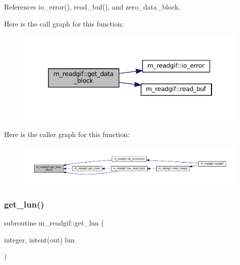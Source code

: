 References io\+\_\+error(), read\+\_\+buf(), and zero\+\_\+data\+\_\+block.

Here is the call graph for this function\+:\nopagebreak
\begin{figure}[H]
\begin{center}
\leavevmode
\includegraphics[width=346pt]{namespacem__readgif_ace6e51d0293107696bd1482348414a43_cgraph}
\end{center}
\end{figure}
Here is the caller graph for this function\+:\nopagebreak
\begin{figure}[H]
\begin{center}
\leavevmode
\includegraphics[width=350pt]{namespacem__readgif_ace6e51d0293107696bd1482348414a43_icgraph}
\end{center}
\end{figure}
\mbox{\label{namespacem__readgif_a7109d632cddcb8d66729d25bbed5c33c}} 
\subsubsection{\texorpdfstring{get\+\_\+lun()}{get\_lun()}}
{\footnotesize\ttfamily subroutine m\+\_\+readgif\+::get\+\_\+lun (\begin{DoxyParamCaption}\item[{integer, intent(out)}]{lun }\end{DoxyParamCaption})\hspace{0.3cm}{\ttfamily [private]}}

